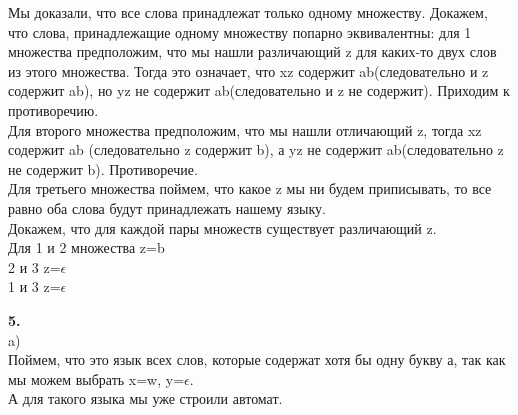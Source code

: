 \documentclass[a4paper,12pt]{article}
\begin{document}
Мы доказали, что все слова принадлежат только одному множеству. Докажем, что слова, принадлежащие одному множеству попарно эквивалентны: для 1 множества предположим, что мы нашли различающий z для каких-то двух слов из этого множества. Тогда это означает, что xz содержит ab(следовательно и z содержит ab),  но yz не содержит ab(следовательно и z не содержит). Приходим к противоречию.\\
Для второго множества предположим, что мы нашли отличающий z, тогда xz содержит ab (следовательно z содержит b), а yz не содержит ab(следовательно z не содержит b). Противоречие.\\
Для третьего множества поймем, что какое z  мы ни будем приписывать, то все равно оба слова будут принадлежать нашему языку.\\
Докажем, что для каждой пары множеств существует различающий z.\\
Для 1 и 2 множества z=b\\
2 и 3 z=$\epsilon$\\
1 и 3 z=$\epsilon$\\
\begin{center} 
\end{center}
\textbf{5.}\\
a)\\
Поймем, что это язык всех слов, которые содержат хотя бы одну букву  а, так как мы можем выбрать x=w, y=$\epsilon$.\\
А для такого языка мы уже строили автомат.\\
\begin{center} 
\end{center}
\end{document}
